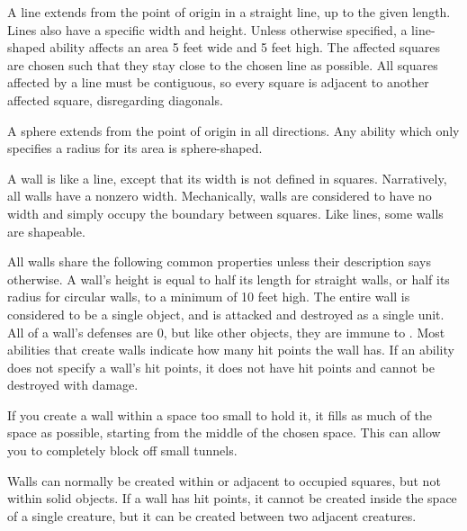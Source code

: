              A line extends from the point of origin in a straight line, up to the given length.
            Lines also have a specific width and height.
            Unless otherwise specified, a line-shaped ability affects an area 5 feet wide and 5 feet high.
            The affected squares are chosen such that they stay close to the chosen line as possible.
            All squares affected by a line must be contiguous, so every square is adjacent to another affected square, disregarding diagonals.

             A sphere extends from the point of origin in all directions.
            Any ability which only specifies a radius for its area is sphere-shaped.

             A wall is like a line, except that its width is not defined in squares.
            Narratively, all walls have a nonzero width.
            Mechanically, walls are considered to have no width and simply occupy the boundary between squares.
            Like lines, some walls are shapeable.

            All walls share the following common properties unless their description says otherwise.
            A wall's height is equal to half its length for straight walls, or half its radius for circular walls, to a minimum of 10 feet high.
            The entire wall is considered to be a single object, and is attacked and destroyed as a single unit.
            All of a wall's defenses are 0, but like other objects, they are immune to .
            Most abilities that create walls indicate how many hit points the wall has.
            If an ability does not specify a wall's hit points, it does not have hit points and cannot be destroyed with damage.

            If you create a wall within a space too small to hold it, it fills as much of the space as possible, starting from the middle of the chosen space.
            This can allow you to completely block off small tunnels.

            Walls can normally be created within or adjacent to occupied squares, but not within solid objects.
            If a wall has hit points, it cannot be created inside the space of a single creature, but it can be created between two adjacent creatures.


